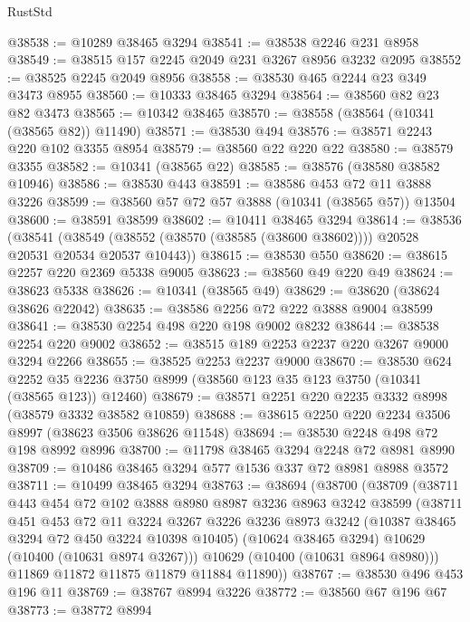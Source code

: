 \begin{lexlean}{RustStd}
\begin{coremodule}
{\begin{coremodule}
{{{{{{{{{{{{{{{{{{{{{{{{{@38538 := @10289 @38465 @3294
@38541 := @38538 @2246 @231 @8958
@38549 := @38515 @157 @2245 @2049 @231 @3267 @8956 @3232 @2095
@38552 := @38525 @2245 @2049 @8956
@38558 := @38530 @465 @2244 @23 @349 @3473 @8955
@38560 := @10333 @38465 @3294
@38564 := @38560 @82 @23 @82 @3473
@38565 := @10342 @38465
@38570 := @38558 (@38564 (@10341 (@38565 @82)) @11490)
@38571 := @38530 @494
@38576 := @38571 @2243 @220 @102 @3355 @8954
@38579 := @38560 @22 @220 @22
@38580 := @38579 @3355
@38582 := @10341 (@38565 @22)
@38585 := @38576 (@38580 @38582 @10946)
@38586 := @38530 @443
@38591 := @38586 @453 @72 @11 @3888 @3226
@38599 := @38560 @57 @72 @57 @3888 (@10341 (@38565 @57)) @13504
@38600 := @38591 @38599
@38602 := @10411 @38465 @3294
@38614 := @38536
    (@38541 (@38549 (@38552 (@38570 (@38585 (@38600 @38602)))) @20528 @20531 @20534 @20537 @10443))
@38615 := @38530 @550
@38620 := @38615 @2257 @220 @2369 @5338 @9005
@38623 := @38560 @49 @220 @49
@38624 := @38623 @5338
@38626 := @10341 (@38565 @49)
@38629 := @38620 (@38624 @38626 @22042)
@38635 := @38586 @2256 @72 @222 @3888 @9004 @38599
@38641 := @38530 @2254 @498 @220 @198 @9002 @8232
@38644 := @38538 @2254 @220 @9002
@38652 := @38515 @189 @2253 @2237 @220 @3267 @9000 @3294 @2266
@38655 := @38525 @2253 @2237 @9000
@38670 := @38530
    @624
    @2252
    @35
    @2236
    @3750
    @8999
    (@38560 @123 @35 @123 @3750 (@10341 (@38565 @123)) @12460)
@38679 := @38571 @2251 @220 @2235 @3332 @8998 (@38579 @3332 @38582 @10859)
@38688 := @38615 @2250 @220 @2234 @3506 @8997 (@38623 @3506 @38626 @11548)
@38694 := @38530 @2248 @498 @72 @198 @8992 @8996
@38700 := @11798 @38465 @3294 @2248 @72 @8981 @8990
@38709 := @10486 @38465 @3294 @577 @1536 @337 @72 @8981 @8988 @3572
@38711 := @10499 @38465 @3294
@38763 := @38694
    (@38700
      (@38709
        (@38711
          @443
          @454
          @72
          @102
          @3888
          @8980
          @8987
          @3236
          @8963
          @3242
          @38599
          (@38711
            @451
            @453
            @72
            @11
            @3224
            @3267
            @3226
            @3236
            @8973
            @3242
            (@10387 @38465 @3294 @72 @450 @3224 @10398 @10405)
            (@10624 @38465 @3294)
            @10629
            (@10400 (@10631 @8974 @3267)))
          @10629
          (@10400 (@10631 @8964 @8980)))
        @11869
        @11872
        @11875
        @11879
        @11884
        @11890))
@38767 := @38530 @496 @453 @196 @11
@38769 := @38767 @8994 @3226
@38772 := @38560 @67 @196 @67
@38773 := @38772 @8994
}}}}}}}}}}}}}}}}}}}}}}}}}
\end{coremodule}}
\end{coremodule}
\end{lexlean}
